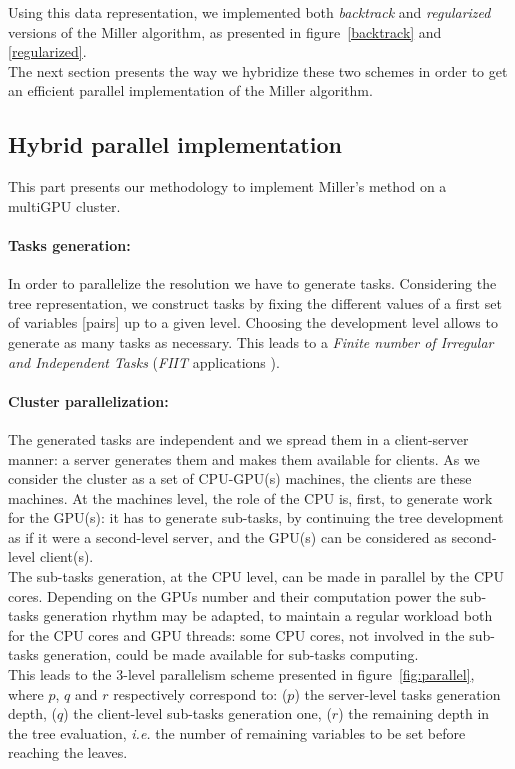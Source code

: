 Using this data representation, 
we implemented both \emph{backtrack} and \emph{regularized} versions of the Miller algorithm, as presented in figure~\ref{backtrack} and \ref{regularized}.
\\
The next section presents the way we hybridize these two schemes in order to get an efficient parallel implementation of the Miller algorithm.

\subsection{Hybrid parallel implementation}
\label{section:parallel_backtrack}
This part presents our methodology to implement Miller's method on a multiGPU cluster.

\paragraph{Tasks generation: }
In order to parallelize the resolution we have to generate tasks. 
Considering the tree representation, we construct tasks by fixing the different values of a first set of variables [pairs] up to a given level. Choosing the development level allows to generate as many tasks as necessary. This leads to a \textit{Finite number of Irregular and Independent Tasks} (\emph{FIIT} applications \cite{krajecki1999object}). 

\paragraph{Cluster parallelization: } 
The generated tasks are independent and we spread them in a client-server manner: a server generates them and makes them available for clients. As we consider the cluster as a set of CPU-GPU(s) machines, the clients are these machines. 
At the machines level, the role of the CPU is, first, to generate work for the GPU(s): it has to generate sub-tasks, by continuing the tree development as if it were a second-level server, and the GPU(s) can be considered as second-level client(s). \\
The sub-tasks generation, at the CPU level, can be made in parallel by the CPU cores. Depending on the GPUs number and their computation power the sub-tasks generation rhythm may be adapted, to maintain a regular workload both for the CPU cores and GPU threads: some CPU cores, not involved in the sub-tasks generation, could be made available for sub-tasks computing.\\
This leads to the 3-level parallelism scheme presented in figure~\ref{fig:parallel}, where $p$, $q$ and $r$ respectively correspond to: ($p$) the server-level tasks generation depth, ($q$) the client-level sub-tasks generation one, ($r$) the remaining depth in the tree evaluation, \textit{i.e.} the number of remaining variables to be set before reaching the leaves.  

